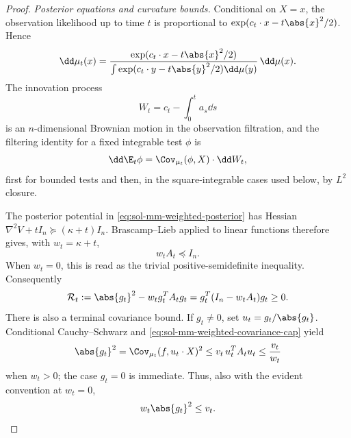 \documentclass[../main.tex]{subfiles}
\begin{document}
\begin{proof}
\noindent\emph{Posterior equations and curvature bounds.}
Conditional on $X=x$, the observation likelihood up to time $t$ is proportional to
$\exp(c_t\cdot x-t\abs{x}^2/2)$.  Hence
\begin{equation}
  \dd\mu_t(x)
  =\frac{\exp(c_t\cdot x-t\abs{x}^2/2)}
  {\int\exp(c_t\cdot y-t\abs{y}^2/2)\dd\mu(y)}\,\dd\mu(x).
  \label{eq:sol-mm-weighted-posterior}
\end{equation}
The innovation process
\[
  W_t=c_t-\int_0^ta_s\dd s
\]
is an $n$-dimensional Brownian motion in the observation filtration, and the filtering
identity for a fixed integrable test $\phi$ is
\begin{equation}
  \dd\E_t\phi=\Cov_{\mu_t}(\phi,X)\cdot\dd W_t,
  \label{eq:sol-mm-weighted-filtering}
\end{equation}
first for bounded tests and then, in the square-integrable cases used below, by $L^2$ closure.

The posterior potential in \eqref{eq:sol-mm-weighted-posterior} has Hessian
$\nabla^2V+tI_n\succeq(\kappa+t)I_n$.  Brascamp--Lieb applied to linear functions therefore
gives, with $w_t=\kappa+t$,
\begin{equation}
  w_tA_t\preceq I_n.
  \label{eq:sol-mm-weighted-covariance-cap}
\end{equation}
When $w_t=0$, this is read as the trivial positive-semidefinite inequality.  Consequently
\begin{equation}
  \mathcal R_t:=\abs{g_t}^2-w_tg_t^TA_tg_t
  =g_t^T(I_n-w_tA_t)g_t\ge0.
  \label{eq:sol-mm-weighted-remainder}
\end{equation}
There is also a terminal covariance bound.  If $g_t\ne0$, set
$u_t=g_t/\abs{g_t}$.  Conditional Cauchy--Schwarz and
\eqref{eq:sol-mm-weighted-covariance-cap} yield
\[
  \abs{g_t}^2
  =\Cov_{\mu_t}(f,u_t\cdot X)^2
  \le v_t\,u_t^TA_tu_t
  \le\frac{v_t}{w_t}
\]
when $w_t>0$; the case $g_t=0$ is immediate.  Thus, also with the evident convention at
$w_t=0$,
\begin{equation}
  w_t\abs{g_t}^2\le v_t.
  \label{eq:sol-mm-weighted-terminal-cap}
\end{equation}


\end{proof}
\end{document}
